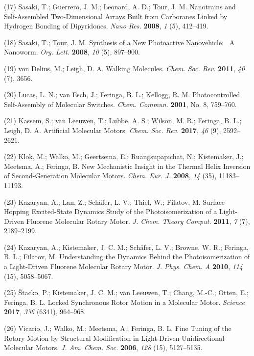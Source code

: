 \documentclass[11pt,notitlepage]{article}
\begin{document}
\leavevmode\hypertarget{ref-10MPrT2Vf}{}%
(17) Sasaki, T.; Guerrero, J. M.; Leonard, A. D.; Tour, J. M. Nanotrains
and Self-Assembled Two-Dimensional Arrays Built from Carboranes Linked
by Hydrogen Bonding of Dipyridones. \emph{Nano Res.} \textbf{2008},
\emph{1} (5), 412--419.

\leavevmode\hypertarget{ref-Tels98bO}{}%
(18) Sasaki, T.; Tour, J. M. Synthesis of a New Photoactive
Nanovehicle:~ A Nanoworm. \emph{Org. Lett.} \textbf{2008}, \emph{10}
(5), 897--900.

\leavevmode\hypertarget{ref-SfUEsk0e}{}%
(19) von Delius, M.; Leigh, D. A. Walking Molecules. \emph{Chem. Soc.
Rev.} \textbf{2011}, \emph{40} (7), 3656.

\leavevmode\hypertarget{ref-jCuccJLJ}{}%
(20) Lucas, L. N.; van Esch, J.; Feringa, B. L.; Kellogg, R. M.
Photocontrolled Self-Assembly of Molecular Switches. \emph{Chem.
Commun.} \textbf{2001}, No. 8, 759--760.

\leavevmode\hypertarget{ref-1H5r7SBir}{}%
(21) Kassem, S.; van Leeuwen, T.; Lubbe, A. S.; Wilson, M. R.; Feringa,
B. L.; Leigh, D. A. Artificial Molecular Motors. \emph{Chem. Soc. Rev.}
\textbf{2017}, \emph{46} (9), 2592--2621.

\leavevmode\hypertarget{ref-FwAqK1Dt}{}%
(22) Klok, M.; Walko, M.; Geertsema, E.; Ruangsupapichat, N.;
Kistemaker, J.; Meetsma, A.; Feringa, B. New Mechanistic Insight in the
Thermal Helix Inversion of Second-Generation Molecular Motors.
\emph{Chem. Eur. J.} \textbf{2008}, \emph{14} (35), 11183--11193.

\leavevmode\hypertarget{ref-so4s7d25}{}%
(23) Kazaryan, A.; Lan, Z.; Schäfer, L. V.; Thiel, W.; Filatov, M.
Surface Hopping Excited-State Dynamics Study of the Photoisomerization
of a Light-Driven Fluorene Molecular Rotary Motor. \emph{J. Chem. Theory
Comput.} \textbf{2011}, \emph{7} (7), 2189--2199.

\leavevmode\hypertarget{ref-N6pRFM85}{}%
(24) Kazaryan, A.; Kistemaker, J. C. M.; Schäfer, L. V.; Browne, W. R.;
Feringa, B. L.; Filatov, M. Understanding the Dynamics Behind the
Photoisomerization of a Light-Driven Fluorene Molecular Rotary Motor.
\emph{J. Phys. Chem. A} \textbf{2010}, \emph{114} (15), 5058--5067.

\leavevmode\hypertarget{ref-mKSNFvW7}{}%
(25) Štacko, P.; Kistemaker, J. C. M.; van Leeuwen, T.; Chang, M.-C.;
Otten, E.; Feringa, B. L. Locked Synchronous Rotor Motion in a Molecular
Motor. \emph{Science} \textbf{2017}, \emph{356} (6341), 964--968.

\leavevmode\hypertarget{ref-gimGEnwq}{}%
(26) Vicario, J.; Walko, M.; Meetsma, A.; Feringa, B. L. Fine Tuning of
the Rotary Motion by Structural Modification in Light-Driven
Unidirectional Molecular Motors. \emph{J. Am. Chem. Soc.} \textbf{2006},
\emph{128} (15), 5127--5135.
\end{document}
